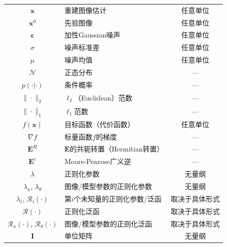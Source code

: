 \documentclass[12pt]{article}
\begin{document}
\begin{table}[h]
\begin{tabularx}{\textwidth}{c X c}
        $\hat{\bm{x}}$ & 重建图像估计 & 任意单位 \\
        $\bm{x}^0$ & 先验图像 & 任意单位 \\
        $\bm{\varepsilon}$ & 加性Gaussian噪声 & 任意单位 \\
        $\sigma$ & 噪声标准差 & 任意单位 \\
        $\mu$ & 噪声均值 & 任意单位 \\
        $\mathcal{N}$ & 正态分布 & --- \\
        $p(\cdot|\cdot)$ & 条件概率 & --- \\
        $\|\cdot\|_2$ & $\ell_2$（Euclidean）范数 & --- \\
        $\|\cdot\|_1$ & $\ell_1$范数 & --- \\
        $f(\bm{x})$ & 目标函数（代价函数） & 任意单位 \\
        $\nabla f$ & 标量函数$f$的梯度 & --- \\
        $\mathbf{E}^H$ & $\mathbf{E}$的共轭转置（Hermitian转置） & --- \\
        $\mathbf{E}^\dagger$ & Moore-Penrose广义逆 & --- \\
        $\lambda$ & 正则化参数 & 无量纲 \\
        $\lambda_x$, $\lambda_\theta$ & 图像/模型参数的正则化参数 & 无量纲 \\
        $\lambda_i$, $\mathcal{R}_i(\cdot)$ & 第$i$个未知量的正则化参数/泛函 & 取决于具体形式 \\
        $\mathcal{R}(\cdot)$ & 正则化泛函 & 取决于具体形式 \\
        $\mathcal{R}_x(\cdot)$, $\mathcal{R}_\theta(\cdot)$ & 图像/模型参数的正则化泛函 & 取决于具体形式 \\
        $\mathbf{I}$ & 单位矩阵 & 无量纲 \\
        \bottomrule
    \end{tabularx}
\end{table}
\end{document}
